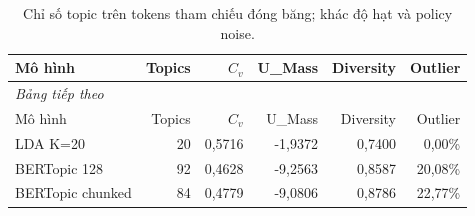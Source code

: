 \begingroup\small\setlength{\tabcolsep}{4pt}\renewcommand{\arraystretch}{1.16}
\begin{longtable}{lrrrrr}
\caption{Chỉ số topic trên tokens tham chiếu đóng băng; khác độ hạt và policy noise.}\label{tab:topics}\\
\toprule Mô hình & Topics & $C_v$ & U\_Mass & Diversity & Outlier \\
\midrule\endfirsthead
\multicolumn{6}{l}{\textit{Bảng tiếp theo}}\\
\toprule Mô hình & Topics & $C_v$ & U\_Mass & Diversity & Outlier \\
\midrule\endhead
\bottomrule\endfoot
LDA K=20 & 20 & 0,5716 & -1,9372 & 0,7400 & 0,00\% \\
BERTopic 128 & 92 & 0,4628 & -9,2563 & 0,8587 & 20,08\% \\
BERTopic chunked & 84 & 0,4779 & -9,0806 & 0,8786 & 22,77\% \\
\end{longtable}\endgroup
{}
